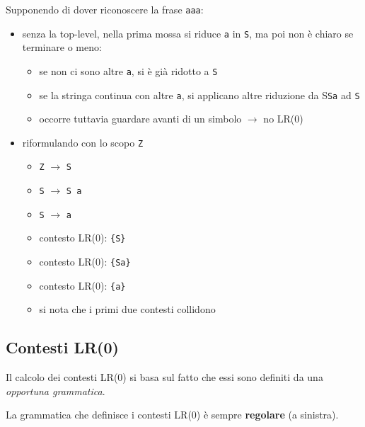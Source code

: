 Supponendo di dover riconoscere la frase \texttt{aaa}:
\begin{itemize}
    \item senza la top-level, nella prima mossa si riduce \texttt{a} in \texttt{S}, ma poi non è chiaro se terminare o meno:
    \begin{itemize}
        \item se non ci sono altre \texttt{a}, si è già ridotto a \texttt{S}
        \item se la stringa continua con altre \texttt{a}, si applicano altre riduzione da S\texttt{Sa} ad \texttt{S}
        \item occorre tuttavia guardare avanti di un simbolo $\rightarrow$ no LR(0)
    \end{itemize}
    \item riformulando con lo scopo \texttt{Z}
    \begin{multicols}{2}
        \begin{itemize}
            \item \texttt{Z} $\rightarrow$ \texttt{S}
            \item \texttt{S} $\rightarrow$ \texttt{S a}
            \item \texttt{S} $\rightarrow$ \texttt{a}
        \end{itemize}
        \columnbreak
        \begin{itemize}
            \item[] contesto LR(0): \texttt{\{S\}}
            \item[] contesto LR(0): \texttt{\{Sa\}}
            \item[] contesto LR(0): \texttt{\{a\}}
        \end{itemize}
    \end{multicols}
    \setlist{}
    \begin{itemize}
        \item si nota che i primi due contesti collidono
    \end{itemize}
\end{itemize}

\subsection{Contesti LR(0)}
Il calcolo dei contesti LR(0) si basa sul fatto che essi sono definiti da una \textit{opportuna grammatica}.
\begin{mdframed}[topline=false,bottomline=false,rightline=false]
La grammatica che definisce i contesti LR(0) è sempre \textbf{regolare} (a sinistra).
\end{mdframed}

